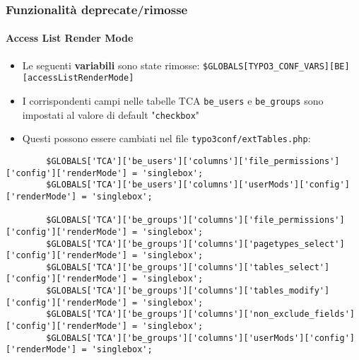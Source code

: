 
\begin{frame}[fragile]
	\frametitle{Funzionalità deprecate/rimosse}
	\framesubtitle{Access List Render Mode}

	\lstset{basicstyle=\tiny\ttfamily}

	\begin{itemize}

		\item Le seguenti \textbf{variabili} sono state rimosse:
			\small\texttt{\$GLOBALS[TYPO3\_CONF\_VARS][BE][accessListRenderMode]}\normalsize

		\item I corrispondenti campi nelle tabelle TCA \texttt{be\_users} e \texttt{be\_groups}
			sono impostati al valore di default "\texttt{checkbox}"

		\item Questi possono essere cambiati nel file \texttt{typo3conf/extTables.php}:

	\end{itemize}

	\begin{lstlisting}
		$GLOBALS['TCA']['be_users']['columns']['file_permissions']['config']['renderMode'] = 'singlebox';
		$GLOBALS['TCA']['be_users']['columns']['userMods']['config']['renderMode'] = 'singlebox';

		$GLOBALS['TCA']['be_groups']['columns']['file_permissions']['config']['renderMode'] = 'singlebox';
		$GLOBALS['TCA']['be_groups']['columns']['pagetypes_select']['config']['renderMode'] = 'singlebox';
		$GLOBALS['TCA']['be_groups']['columns']['tables_select']['config']['renderMode'] = 'singlebox';
		$GLOBALS['TCA']['be_groups']['columns']['tables_modify']['config']['renderMode'] = 'singlebox';
		$GLOBALS['TCA']['be_groups']['columns']['non_exclude_fields']['config']['renderMode'] = 'singlebox';
		$GLOBALS['TCA']['be_groups']['columns']['userMods']['config']['renderMode'] = 'singlebox';
	\end{lstlisting}

\end{frame}

